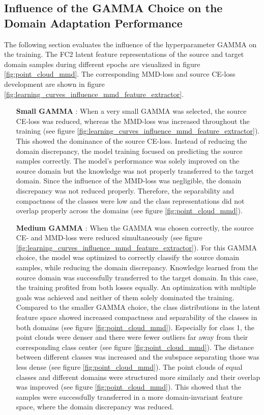 \subsection{Influence of the GAMMA Choice on the Domain Adaptation Performance} \label{sec:Balancing Cross-Entropy and MMD loss}

The following section evaluates the influence of the hyperparameter GAMMA on the training. The FC2 latent feature representations of the source and target domain samples during different epochs are visualized in figure \ref{fig:point_cloud_mmd}. The corresponding MMD-loss and source CE-loss development are shown in figure \ref{fig:learning_curves_influence_mmd_feature_extractor}.
\begin{itemize}
    \item [\textbf{Small GAMMA}]:
    When a very small GAMMA was selected, the source CE-loss was reduced, whereas the MMD-loss was increased throughout the training (see figure \ref{fig:learning_curves_influence_mmd_feature_extractor}). This showed the dominance of the source CE-loss. Instead of reducing the domain discrepancy, the model training focused on predicting the source samples correctly. The model's performance was solely improved on the source domain but the knowledge was not properly transferred to the target domain. Since the influence of the MMD-loss was negligible, the domain discrepancy was not reduced properly. Therefore, the separability and compactness of the classes were low and the class representations did not overlap properly across the domains (see figure \ref{fig:point_cloud_mmd}).
    \item [\textbf{Medium GAMMA}]:
    When the GAMMA was chosen correctly, the source CE- and MMD-loss were reduced simultaneously (see figure \ref{fig:learning_curves_influence_mmd_feature_extractor}). For this GAMMA choice, the model was optimized to correctly classify the source domain samples, while reducing the domain discrepancy. Knowledge learned from the source domain was successfully transferred to the target domain. In this case, the training profited from both losses equally. An optimization with multiple goals was achieved and neither of them solely dominated the training. Compared to the smaller GAMMA choice, the class distributions in the latent feature space showed increased compactness and separability of the classes in both domains (see figure \ref{fig:point_cloud_mmd}). Especially for class 1, the point clouds were denser and there were fewer outliers far away from their corresponding class center (see figure \ref{fig:point_cloud_mmd}). The distance between different classes was increased and the subspace separating those was less dense (see figure \ref{fig:point_cloud_mmd}). The point clouds of equal classes and different domains were structured more similarly and their overlap was improved (see figure \ref{fig:point_cloud_mmd}). This showed that the samples were successfully transferred in a more domain-invariant feature space, where the domain discrepancy was reduced.

\end{itemize}
